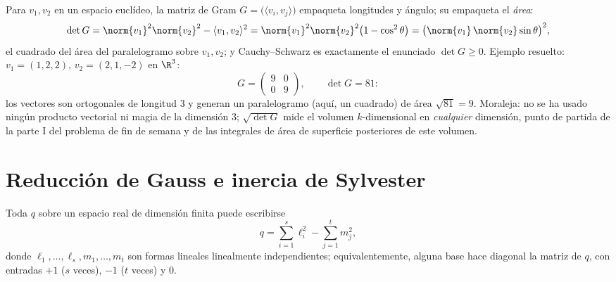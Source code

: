 \begin{example}\label{ex:b2:quadratic:gramarea}
Para $v_1, v_2$ en un espacio euclídeo, la matriz de Gram $G =
\bigl(\langle v_i, v_j\rangle\bigr)$ empaqueta longitudes y ángulo;
su  empaqueta el \emph{área}:
\[
\det G = \norm{v_1}^2\norm{v_2}^2 - \langle v_1, v_2\rangle^2
= \norm{v_1}^2\norm{v_2}^2\bigl(1 - \cos^2\theta\bigr)
= \bigl(\norm{v_1}\,\norm{v_2}\sin\theta\bigr)^2 ,
\]
el cuadrado del área del paralelogramo sobre $v_1, v_2$; y
Cauchy--Schwarz es exactamente el enunciado $\det G \geq 0$. Ejemplo
resuelto: $v_1 = (1, 2, 2)$, $v_2 = (2, 1, -2)$ en $\R^3$:
\[
G = \begin{pmatrix} 9 & 0\\ 0 & 9 \end{pmatrix},
\qquad
\det G = 81 :
\]
los vectores son ortogonales de longitud $3$ y generan un
paralelogramo (aquí, un cuadrado) de área $\sqrt{81} = 9$. Moraleja:
no se ha usado ningún producto vectorial ni magia de la dimensión
$3$; $\sqrt{\det G}$ mide el volumen $k$-dimensional en
\emph{cualquier} dimensión, punto de partida de la parte I del
problema de fin de semana y de las integrales de área de superficie
posteriores de este volumen.
\end{example}

\section{Reducción de Gauss e inercia de Sylvester}

\begin{theorem}\label{thm:b2:quadratic:gauss}
Toda  $q$ sobre un espacio real de dimensión finita
puede escribirse
\[
q = \sum_{i=1}^{s} \ell_i^2 - \sum_{j=1}^{t} m_j^2 ,
\]
donde $\ell_1, \dots, \ell_s, m_1, \dots, m_t$ son formas lineales
linealmente independientes; equivalentemente, alguna base hace
diagonal la matriz de $q$, con entradas $+1$ ($s$ veces), $-1$ ($t$
veces) y $0$.
\end{theorem}


